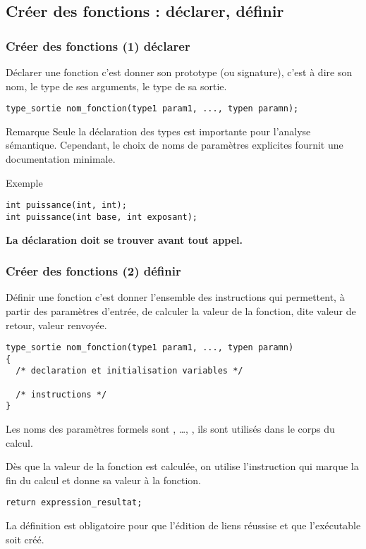 \documentclass[xcolor=pdftex,svgnames,table]{beamer}
\begin{document}
\subsection{Créer des fonctions : déclarer, définir}
\begin{frame}[fragile]
  \frametitle{Créer des fonctions (1)  déclarer}
Déclarer une fonction c'est donner son prototype (ou signature), c'est
à dire son nom, le type de ses arguments, le type de sa sortie.\pause
\begin{lstlisting}[basicstyle=\ttfamily\scriptsize] 
type_sortie nom_fonction(type1 param1, ..., typen paramn);
\end{lstlisting}
\pause
\begin{block}{Remarque} 
  Seule la déclaration des types est importante pour
  l'analyse sémantique. Cependant, le choix de noms de paramètres
  explicites fournit une documentation minimale.
\end{block}


\pause
\begin{block}{Exemple}
  
\begin{lstlisting}[basicstyle=\ttfamily\small] 
int puissance(int, int); 
int puissance(int base, int exposant);
\end{lstlisting}
\end{block}
\pause
\textbf{La déclaration doit se trouver avant tout appel.}
\end{frame}
\begin{frame}[fragile]
  \frametitle{Créer des fonctions (2)  définir}
\pause
Définir une fonction c'est donner l'ensemble des instructions qui
permettent, à partir des paramètres d'entrée, de calculer la valeur de
la fonction, dite valeur de retour, valeur renvoyée.\pause
\begin{lstlisting}[basicstyle=\ttfamily\scriptsize] 
type_sortie nom_fonction(type1 param1, ..., typen paramn)
{
  /* declaration et initialisation variables */
 
  /* instructions */
}
\end{lstlisting}\pause
Les noms des paramètres
formels sont , \ldots, , ils sont utilisés dans le
corps du calcul.
\pause 

Dès que la valeur de la 
fonction est calculée, on utilise l'instruction  qui marque
la fin du calcul et donne sa valeur à la fonction. \pause
\begin{lstlisting}[basicstyle=\ttfamily\small] 
  return expression_resultat;
\end{lstlisting}

La définition est obligatoire pour que l'édition de liens réussise et que l'exécutable soit créé. 
\end{frame}
\end{document}

